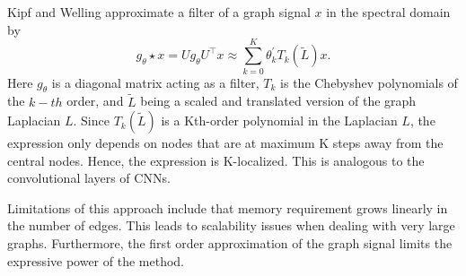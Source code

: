 \documentclass{article}
\begin{document}
\section{}
\section{}
\section{}
\subsection{}
\cite{kipf_semi-supervised_2017} 

Kipf and Welling approximate a filter of a graph signal $x$ in the spectral domain by 
$$
g_\theta \star x=U g_\theta U^{\top} x \approx \sum_{k=0}^K \theta_k^{\prime} T_k(\tilde{L}) x.
$$
Here $g_\theta$ is a diagonal matrix acting as a filter, $T_k$ is the Chebyshev polynomials of the $k-th$ order, and $\tilde{L}$ being a scaled and translated version of the graph Laplacian $L$. Since $T_k(\tilde{L})$ is a Kth-order polynomial in the Laplacian $L$, the expression only depends on nodes that are at maximum K steps away from the central nodes. Hence, the expression is K-localized. This is analogous to the convolutional layers of CNNs.    

Limitations of this approach include that memory requirement grows linearly in the number of edges. This leads to scalability issues when dealing with very large graphs. Furthermore, the first order approximation of the graph signal limits the expressive power of the method.
\end{document}
